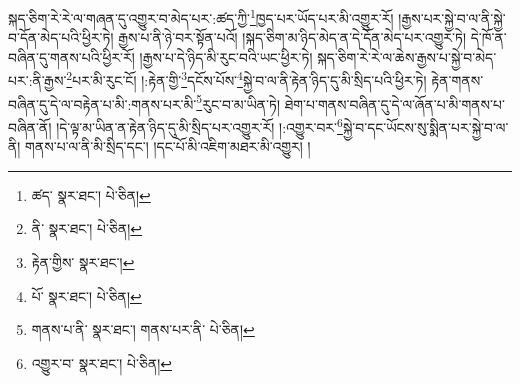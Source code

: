 སྐད་ཅིག་རེ་རེ་ལ་གཞན་དུ་འགྱུར་བ་མེད་པར་:ཚད་ཀྱི་\footnote{ཚད་  སྣར་ཐང་།  པེ་ཅིན། }ཁྱད་པར་ཡོད་པར་མི་འགྱུར་རོ། །རྒྱས་པར་སྐྱེ་བ་ལ་ནི་སྐྱེ་བ་དོན་མེད་པའི་ཕྱིར་ཏེ། རྒྱས་པ་ནི་ཉེ་བར་སྟོན་པའོ། །སྐད་ཅིག་མ་ཉིད་མེད་ན་དེ་དོན་མེད་པར་འགྱུར་ཏེ། དེ་ཁོ་ན་བཞིན་དུ་གནས་པའི་ཕྱིར་རོ། །རྒྱས་པ་དེ་ཉིད་མི་རུང་བའི་ཡང་ཕྱིར་ཏེ། སྐད་ཅིག་རེ་རེ་ལ་ཆེས་རྒྱས་པ་སྐྱེ་བ་མེད་པར་:ནི་རྒྱས་\footnote{ནི་  སྣར་ཐང་།  པེ་ཅིན། }པར་མི་རུང་ངོ། །:རྟེན་གྱི་\footnote{རྟེན་གྱིས་  སྣར་ཐང་། }དངོས་པོས་\footnote{པོ་  སྣར་ཐང་།  པེ་ཅིན། }སྐྱེ་བ་ལ་ནི་རྟེན་ཉིད་དུ་མི་སྲིད་པའི་ཕྱིར་ཏེ། རྟེན་གནས་བཞིན་དུ་དེ་ལ་བརྟེན་པ་མི་:གནས་པར་མི་\footnote{གནས་པ་ནི་  སྣར་ཐང་། གནས་པར་ནི་  པེ་ཅིན། }རུང་བ་མ་ཡིན་ཏེ། ཐེག་པ་གནས་བཞིན་དུ་དེ་ལ་ཞོན་པ་མི་གནས་པ་བཞིན་ནོ། །དེ་ལྟ་མ་ཡིན་ན་རྟེན་ཉིད་དུ་མི་སྲིད་པར་འགྱུར་རོ། །:འགྱུར་བར་\footnote{འགྱུར་བ་  སྣར་ཐང་།  པེ་ཅིན། }སྐྱེ་བ་དང་ཡོངས་སུ་སྨིན་པར་སྐྱེ་བ་ལ་ནི། གནས་པ་ལ་ནི་མི་སྲིད་དང་། །དང་པོ་མི་འཇིག་མཐར་མི་འགྱུར། །
